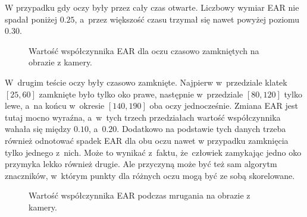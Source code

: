 W przypadku gdy oczy były przez cały czas otwarte. Liczbowy wymiar EAR nie spadał poniżej $0.25$, a~przez większość czasu trzymał się nawet powyżej poziomu $0.30$.

\begin{figure}[!h]
    \centering
    \caption{Wartość współczynnika EAR dla oczu czasowo zamkniętych na obrazie z kamery.}
    \label{fig:ear_live_close}
\end{figure}

W~drugim teście oczy były czasowo zamknięte. Najpierw w~przedziale klatek $[25, 60]$ zamknięte było tylko oko prawe, następnie w~przedziale $[80,120]$ tylko lewe, a~na końcu w~okresie $[140,190]$ oba oczy jednocześnie. Zmiana EAR jest tutaj mocno wyraźna, a~w~tych trzech przedziałach wartość współczynnika wahała się między $0.10$, a~$0.20$. Dodatkowo na podstawie tych danych trzeba również odnotować spadek EAR dla obu oczu nawet w przypadku zamknięcia tylko jednego z~nich. Może to wynikać z~faktu, że~człowiek zamykając jedno oko przymyka lekko również drugie. Ale przyczyną może być też sam algorytm znaczników, w~którym punkty dla różnych oczu mogą być ze sobą skorelowane.

\begin{figure}[!h]
    \centering
    \caption{Wartość współczynnika EAR podczas mrugania na obrazie z kamery.}
    \label{fig:ear_live_blink}
\end{figure}

